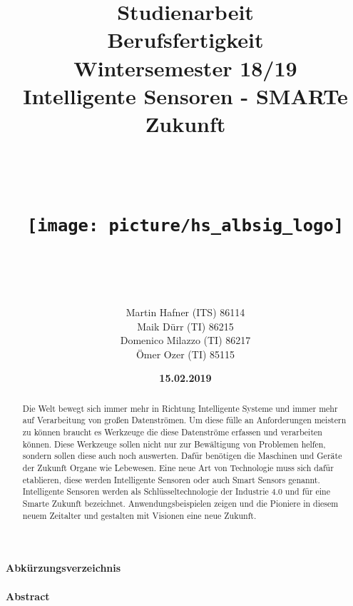 \documentclass[a4paper,12pt]{scrartcl}
\begin{document}
\title{Studienarbeit \vspace{20px} \hfill \\ Berufsfertigkeit\\ Wintersemester 18/19 \vspace{20px} \hfill \\  \vspace{50px} 
Intelligente Sensoren - SMARTe Zukunft \hfill \\ \hfill \\
\hfill \\ 
\begin{center}
\texttt{[image: picture/hs\_albsig\_logo]}
\end{center}
\hfill \\  \vspace{10px}
}


\author{Martin Hafner (ITS) 86114 \hfill \\
Maik Dürr (TI) 86215 \hfill \\
Domenico Milazzo (TI) 86217 \hfill \\
Ömer Ozer (TI) 85115 \hfill \\
}
\vspace{10px}
\date{\textbf{15.02.2019}}
\maketitle
\thispagestyle{empty}
\clearpage
\tableofcontents
\listoffigures
\listoftables
\paragraph{\Large{Abkürzungsverzeichnis}}
\begin{acronym}[Bash]
\end{acronym}
\onehalfspacing

\paragraph{\large Abstract}
\begin{abstract}
Die Welt bewegt sich immer mehr in Richtung Intelligente Systeme und immer mehr auf Verarbeitung von großen Datenströmen. Um diese fülle an Anforderungen meistern zu können braucht es Werkzeuge die diese Datenströme erfassen und verarbeiten können. Diese Werkzeuge sollen nicht nur zur Bewältigung von Problemen helfen, sondern sollen diese auch noch auswerten. Dafür benötigen die Maschinen und Geräte der Zukunft Organe wie Lebewesen. Eine neue Art von Technologie muss sich dafür etablieren, diese werden Intelligente Sensoren oder auch Smart Sensors genannt.
Intelligente Sensoren werden als Schlüsseltechnologie der Industrie 4.0 und für eine Smarte Zukunft bezeichnet. Anwendungsbeispielen zeigen und die Pioniere in diesem neuem Zeitalter und gestalten mit Visionen eine neue Zukunft.
\end{abstract}
\end{document}
